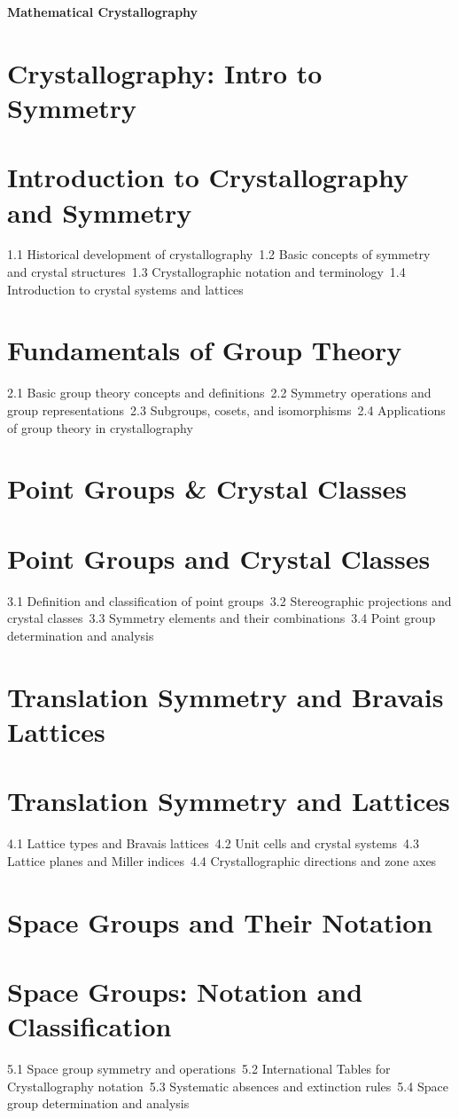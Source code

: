 {\LARGE \bf{Mathematical Crystallography}}
\section{Crystallography: Intro to Symmetry}
\section{Introduction to Crystallography and Symmetry}
1.1 Historical development of crystallography\
1.2 Basic concepts of symmetry and crystal structures\
1.3 Crystallographic notation and terminology\
1.4 Introduction to crystal systems and lattices\
\section{Fundamentals of Group Theory}
2.1 Basic group theory concepts and definitions\
2.2 Symmetry operations and group representations\
2.3 Subgroups, cosets, and isomorphisms\
2.4 Applications of group theory in crystallography\
\section{Point Groups \& Crystal Classes}
\section{Point Groups and Crystal Classes}
3.1 Definition and classification of point groups\
3.2 Stereographic projections and crystal classes\
3.3 Symmetry elements and their combinations\
3.4 Point group determination and analysis\
\section{Translation Symmetry and Bravais Lattices}
\section{Translation Symmetry and Lattices}
4.1 Lattice types and Bravais lattices\
4.2 Unit cells and crystal systems\
4.3 Lattice planes and Miller indices\
4.4 Crystallographic directions and zone axes\
\section{Space Groups and Their Notation}
\section{Space Groups: Notation and Classification}
5.1 Space group symmetry and operations\
5.2 International Tables for Crystallography notation\
5.3 Systematic absences and extinction rules\
5.4 Space group determination and analysis\
